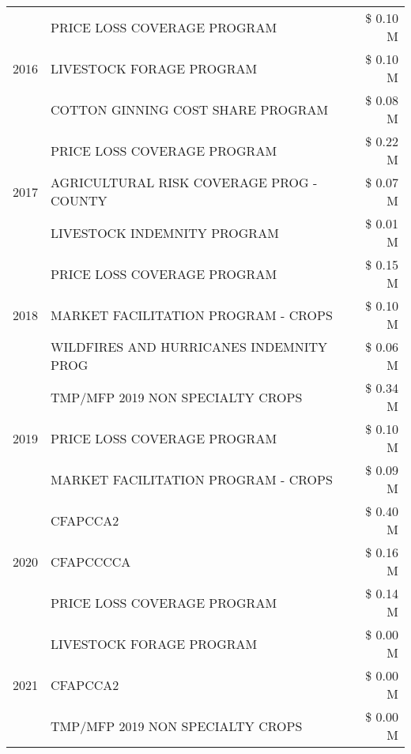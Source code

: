 \begin{tabular}{llr}
\cline{1-3}
\multirow[t]{3}{*}{2016} & PRICE LOSS COVERAGE PROGRAM & \$ 0.10 M \\
 & LIVESTOCK FORAGE PROGRAM & \$ 0.10 M \\
 & COTTON GINNING COST SHARE PROGRAM & \$ 0.08 M \\
\cline{1-3}
\multirow[t]{3}{*}{2017} & PRICE LOSS COVERAGE PROGRAM & \$ 0.22 M \\
 & AGRICULTURAL RISK COVERAGE PROG - COUNTY & \$ 0.07 M \\
 & LIVESTOCK INDEMNITY PROGRAM & \$ 0.01 M \\
\cline{1-3}
\multirow[t]{3}{*}{2018} & PRICE LOSS COVERAGE PROGRAM & \$ 0.15 M \\
 & MARKET FACILITATION PROGRAM - CROPS & \$ 0.10 M \\
 & WILDFIRES AND HURRICANES INDEMNITY PROG & \$ 0.06 M \\
\cline{1-3}
\multirow[t]{3}{*}{2019} & TMP/MFP 2019 NON SPECIALTY CROPS & \$ 0.34 M \\
 & PRICE LOSS COVERAGE PROGRAM & \$ 0.10 M \\
 & MARKET FACILITATION PROGRAM - CROPS & \$ 0.09 M \\
\cline{1-3}
\multirow[t]{3}{*}{2020} & CFAPCCA2 & \$ 0.40 M \\
 & CFAPCCCCA & \$ 0.16 M \\
 & PRICE LOSS COVERAGE PROGRAM & \$ 0.14 M \\
\cline{1-3}
\multirow[t]{3}{*}{2021} & LIVESTOCK FORAGE PROGRAM & \$ 0.00 M \\
 & CFAPCCA2 & \$ 0.00 M \\
 & TMP/MFP 2019 NON SPECIALTY CROPS & \$ 0.00 M \\
\cline{1-3}
\bottomrule
\end{tabular}
